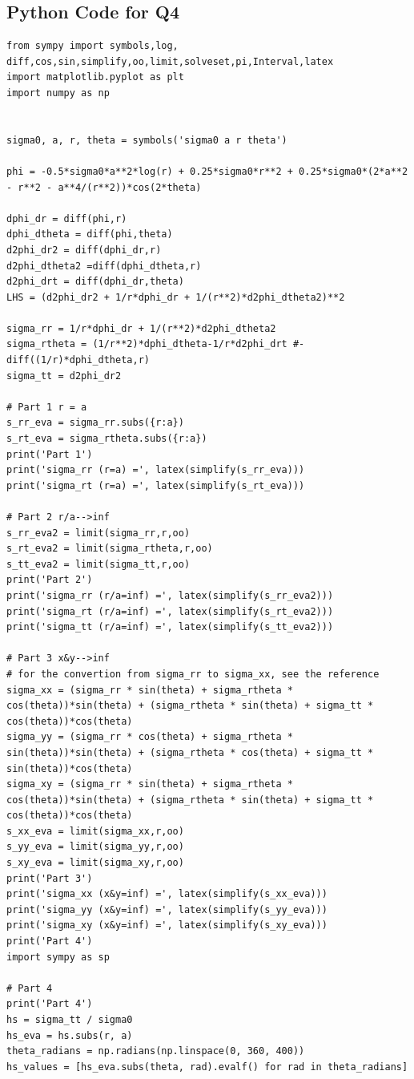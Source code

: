 \documentclass[12pt]{article} %
\begin{document}
\subsection*{Python Code for Q4}
\begin{lstlisting}
from sympy import symbols,log, diff,cos,sin,simplify,oo,limit,solveset,pi,Interval,latex
import matplotlib.pyplot as plt
import numpy as np


sigma0, a, r, theta = symbols('sigma0 a r theta')

phi = -0.5*sigma0*a**2*log(r) + 0.25*sigma0*r**2 + 0.25*sigma0*(2*a**2 - r**2 - a**4/(r**2))*cos(2*theta)

dphi_dr = diff(phi,r)
dphi_dtheta = diff(phi,theta)
d2phi_dr2 = diff(dphi_dr,r)
d2phi_dtheta2 =diff(dphi_dtheta,r)
d2phi_drt = diff(dphi_dr,theta)
LHS = (d2phi_dr2 + 1/r*dphi_dr + 1/(r**2)*d2phi_dtheta2)**2

sigma_rr = 1/r*dphi_dr + 1/(r**2)*d2phi_dtheta2
sigma_rtheta = (1/r**2)*dphi_dtheta-1/r*d2phi_drt #- diff((1/r)*dphi_dtheta,r)
sigma_tt = d2phi_dr2

# Part 1 r = a
s_rr_eva = sigma_rr.subs({r:a})
s_rt_eva = sigma_rtheta.subs({r:a})
print('Part 1')
print('sigma_rr (r=a) =', latex(simplify(s_rr_eva)))
print('sigma_rt (r=a) =', latex(simplify(s_rt_eva)))

# Part 2 r/a-->inf
s_rr_eva2 = limit(sigma_rr,r,oo)
s_rt_eva2 = limit(sigma_rtheta,r,oo)
s_tt_eva2 = limit(sigma_tt,r,oo)
print('Part 2')
print('sigma_rr (r/a=inf) =', latex(simplify(s_rr_eva2)))
print('sigma_rt (r/a=inf) =', latex(simplify(s_rt_eva2)))
print('sigma_tt (r/a=inf) =', latex(simplify(s_tt_eva2)))

# Part 3 x&y-->inf
# for the convertion from sigma_rr to sigma_xx, see the reference
sigma_xx = (sigma_rr * sin(theta) + sigma_rtheta * cos(theta))*sin(theta) + (sigma_rtheta * sin(theta) + sigma_tt * cos(theta))*cos(theta)
sigma_yy = (sigma_rr * cos(theta) + sigma_rtheta * sin(theta))*sin(theta) + (sigma_rtheta * cos(theta) + sigma_tt * sin(theta))*cos(theta)
sigma_xy = (sigma_rr * sin(theta) + sigma_rtheta * cos(theta))*sin(theta) + (sigma_rtheta * sin(theta) + sigma_tt * cos(theta))*cos(theta)
s_xx_eva = limit(sigma_xx,r,oo)
s_yy_eva = limit(sigma_yy,r,oo)
s_xy_eva = limit(sigma_xy,r,oo)
print('Part 3')
print('sigma_xx (x&y=inf) =', latex(simplify(s_xx_eva)))
print('sigma_yy (x&y=inf) =', latex(simplify(s_yy_eva)))
print('sigma_xy (x&y=inf) =', latex(simplify(s_xy_eva)))
print('Part 4')
import sympy as sp

# Part 4 
print('Part 4')
hs = sigma_tt / sigma0
hs_eva = hs.subs(r, a)
theta_radians = np.radians(np.linspace(0, 360, 400))
hs_values = [hs_eva.subs(theta, rad).evalf() for rad in theta_radians]


\end{lstlisting}
\end{document}
